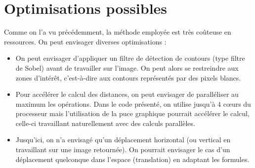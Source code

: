 \documentclass[10pt,a4paper]{article}
\begin{document}
	\section{Optimisations possibles}
		Comme on l'a vu précédemment, la méthode employée est très coûteuse en ressources. On peut envisager diverses optimisations :
		\begin{itemize}
			\item On peut envisager d'appliquer un filtre de détection de contours (type filtre de Sobel) avant de travailler sur l'image. On peut alors se restreindre aux zones d'intérêt, c'est-à-dire aux contours représentés par des pixels blancs.
			\item Pour accélérer le calcul des distances, on peut envisager de paralléliser au maximum les opérations. Dans le code présenté, on utilise jusqu'à $4$ c{\oe}urs du processeur mais l'utilisation de la puce graphique pourrait accélérer le calcul, celle-ci travaillant naturellement avec des calculs parallèles.
			\item Jusqu'ici, on n'a envisagé qu'un déplacement horizontal (ou vertical en travaillant sur une image retournée). On pourrait envisager le cas d'un déplacement quelconque dans l'espace (translation) en adaptant les formules.
		\end{itemize}
	
	\nocite{article2}
	\nocite{templateMatching}
	\nocite{phaseCorrelation}
	
	
	
\end{document}
